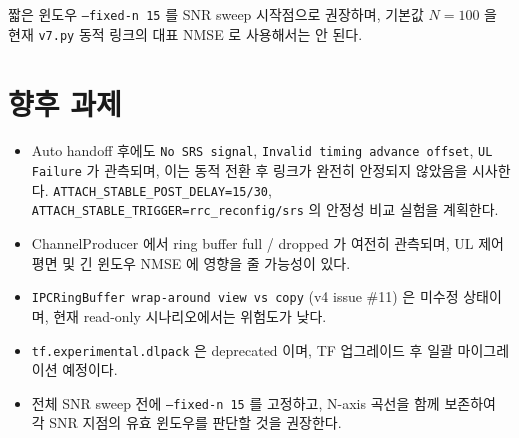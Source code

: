 \documentclass[11pt,a4paper]{article}
\newcommand{\vseven}{\texttt{v7.py}}
\begin{document}
짧은 윈도우 \texttt{--fixed-n 15} 를 SNR sweep 시작점으로 권장하며,
기본값 $N=100$ 을 현재 \vseven{} 동적 링크의 대표 NMSE 로 사용해서는
안 된다.

\section{향후 과제}
\label{sec:todo}

\begin{itemize}
  \item Auto handoff 후에도 \texttt{No SRS signal},
        \texttt{Invalid timing advance offset}, \texttt{UL Failure} 가
        관측되며, 이는 동적 전환 후 링크가 완전히 안정되지 않았음을
        시사한다. \texttt{ATTACH\_STABLE\_POST\_DELAY=15/30},
        \texttt{ATTACH\_STABLE\_TRIGGER=rrc\_reconfig/srs} 의 안정성
        비교 실험을 계획한다.
  \item ChannelProducer 에서 ring buffer full / dropped 가 여전히
        관측되며, UL 제어 평면 및 긴 윈도우 NMSE 에 영향을 줄 가능성이
        있다.
  \item \texttt{IPCRingBuffer wrap-around view vs copy} (v4 issue \#11)
        은 미수정 상태이며, 현재 read-only 시나리오에서는 위험도가 낮다.
  \item \texttt{tf.experimental.dlpack} 은 deprecated 이며, TF 업그레이드
        후 일괄 마이그레이션 예정이다.
  \item 전체 SNR sweep 전에 \texttt{--fixed-n 15} 를 고정하고, N-axis
        곡선을 함께 보존하여 각 SNR 지점의 유효 윈도우를 판단할 것을
        권장한다.
\end{itemize}
\end{document}
